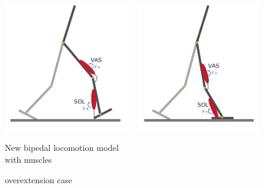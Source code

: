 \documentclass[10pt]{beamer}
\begin{document}
\begin{frame}
\begin{figure}
\begin{overprint}
		\begin{columns}
			\begin{column}{.55\textwidth}
				\centering
				\includegraphics[height=.5\textheight]{images/new_model/stance/muscle_vas_sol.pdf}
				\caption{New bipedal locomotion model with muscles}
			\end{column}
			\begin{column}{.5\textwidth}
				\centering
				\includegraphics[height=.5\textheight]{images/new_model/stance/muscle_vas_sol_overextension.pdf}
				\caption{overextension case}
			\end{column}  
		\end{columns}
			

\end{overprint}
\end{figure}
\end{frame}
\end{document}

